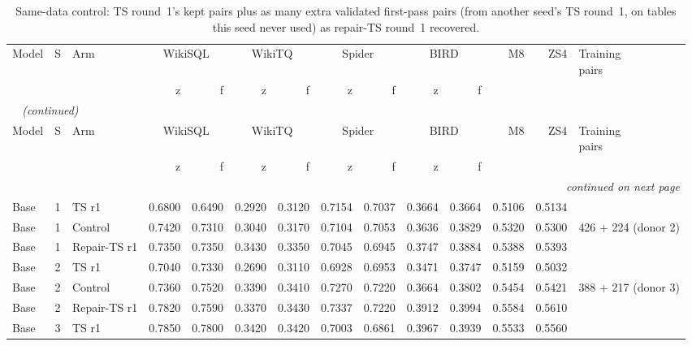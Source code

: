 {\footnotesize
{}
\setlength{\tabcolsep}{3.2pt}
\begin{longtable}{@{}lclrrrrrrrrrrl@{}}
\caption{Same-data control: TS round~1's kept pairs plus as many extra validated first-pass pairs (from another seed's TS round~1, on tables this seed never used) as repair-TS round~1 recovered.}\label{tab:gen-samedata}\\
\toprule
\rowcolor{headshade}Model & S & Arm & \multicolumn{2}{c}{WikiSQL} & \multicolumn{2}{c}{WikiTQ} & \multicolumn{2}{c}{Spider} & \multicolumn{2}{c}{BIRD} & M8 & ZS4 & \makecell{Training\\pairs}\\\rowcolor{headshade} & & & z & f & z & f & z & f & z & f & & &\\
\midrule
\endfirsthead
\multicolumn{14}{l}{\textit{\tablename~\thetable{} (continued)}}\\
\toprule
\rowcolor{headshade}Model & S & Arm & \multicolumn{2}{c}{WikiSQL} & \multicolumn{2}{c}{WikiTQ} & \multicolumn{2}{c}{Spider} & \multicolumn{2}{c}{BIRD} & M8 & ZS4 & \makecell{Training\\pairs}\\\rowcolor{headshade} & & & z & f & z & f & z & f & z & f & & &\\
\midrule
\endhead
\midrule
\multicolumn{14}{r}{\textit{continued on next page}}\\
\endfoot
\bottomrule
\endlastfoot
Base & 1 & TS r1 & 0.6800 & 0.6490 & 0.2920 & 0.3120 & 0.7154 & 0.7037 & 0.3664 & 0.3664 & 0.5106 & 0.5134 & \\
Base & 1 & Control & 0.7420 & 0.7310 & 0.3040 & 0.3170 & 0.7104 & 0.7053 & 0.3636 & 0.3829 & 0.5320 & 0.5300 & 426 + 224 (donor 2)\\
Base & 1 & Repair-TS r1 & 0.7350 & 0.7350 & 0.3430 & 0.3350 & 0.7045 & 0.6945 & 0.3747 & 0.3884 & 0.5388 & 0.5393 & \\
\midrule
Base & 2 & TS r1 & 0.7040 & 0.7330 & 0.2690 & 0.3110 & 0.6928 & 0.6953 & 0.3471 & 0.3747 & 0.5159 & 0.5032 & \\
Base & 2 & Control & 0.7360 & 0.7520 & 0.3390 & 0.3410 & 0.7270 & 0.7220 & 0.3664 & 0.3802 & 0.5454 & 0.5421 & 388 + 217 (donor 3)\\
Base & 2 & Repair-TS r1 & 0.7820 & 0.7590 & 0.3370 & 0.3430 & 0.7337 & 0.7220 & 0.3912 & 0.3994 & 0.5584 & 0.5610 & \\
\midrule
Base & 3 & TS r1 & 0.7850 & 0.7800 & 0.3420 & 0.3420 & 0.7003 & 0.6861 & 0.3967 & 0.3939 & 0.5533 & 0.5560 & \\

\end{longtable}}

